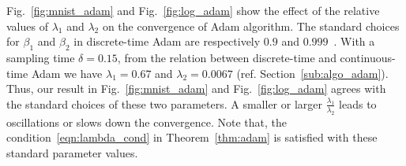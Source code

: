 Fig.~\ref{fig:mnist_adam} and Fig.~\ref{fig:log_adam} show the effect of the relative values of $\lambda_1$ and $\lambda_2$ on the convergence of Adam algorithm. The standard choices for $\beta_1$ and $\beta_2$ in discrete-time Adam are respectively $0.9$ and $0.999$~\cite{kingma2014adam}. With a sampling time $\delta = 0.15$, from the relation between discrete-time and continuous-time Adam we have $\lambda_1 = 0.67$ and $\lambda_2 = 0.0067$ (ref. Section~\ref{sub:algo_adam}). Thus, our result in Fig.~\ref{fig:mnist_adam} and Fig.~\ref{fig:log_adam} agrees with the standard choices of these two parameters. A smaller or larger $\frac{\lambda_1}{\lambda_2}$ leads to oscillations or slows down the convergence. Note that, the condition~\eqref{eqn:lambda_cond} in Theorem~\ref{thm:adam} is satisfied with these standard parameter values. 